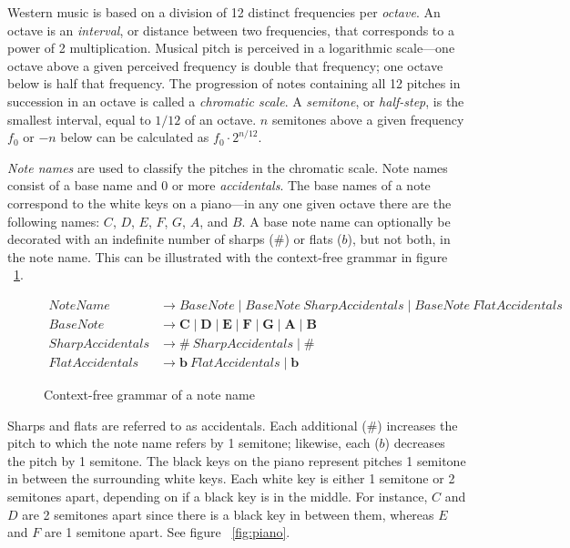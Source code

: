 Western music is based on a division of 12 distinct frequencies per \textit{octave}. An octave is an \textit{interval}, or distance between two frequencies, that corresponds to a power of 2 multiplication. Musical pitch is perceived in a logarithmic scale---one octave above a given perceived frequency is double that frequency; one octave below is half that frequency. The progression of notes containing all 12 pitches in succession in an octave is called a \textit{chromatic scale}. A \textit{semitone}, or \textit{half-step}, is the smallest interval, equal to $1/12$ of an octave. $n$ semitones above a given frequency $f_0$ or $-n$ below can be calculated as $f_0 \cdot 2^{n/12}$.

\textit{Note names} are used to classify the pitches in the chromatic scale. Note names consist of a base name and 0 or more \textit{accidentals}. The base names of a note correspond to the white keys on a piano---in any one given octave there are the following names: $C$, $D$, $E$, $F$, $G$, $A$, and $B$. A base note name can optionally be decorated with an indefinite number of sharps ($\#$) or flats ($b$), but not both, in the note name. This can be illustrated with the context-free grammar in figure ~\ref{fig:cfgnote}.

\begin{figure}[h!]
\begin{center}
\begin{align*}
NoteName &\to BaseNote \mid BaseNote\ SharpAccidentals \mid BaseNote\ FlatAccidentals \\
BaseNote &\to \mathbf{C} \mid \mathbf{D} \mid \mathbf{E} \mid \mathbf{F} \mid \mathbf{G} \mid \mathbf{A} \mid \mathbf{B} \\
SharpAccidentals &\to \bm{\#}\ SharpAccidentals \mid \bm{\#} \\
FlatAccidentals &\to \bm{b}\ FlatAccidentals \mid \bm{b}
\end{align*}
\caption{Context-free grammar of a note name}
\label{fig:cfgnote}
\end{center}
\end{figure}


Sharps and flats are referred to as accidentals. Each additional ($\#$) increases the pitch to which the note name refers by 1 semitone; likewise, each ($b$) decreases the pitch by 1 semitone.  The black keys on the piano represent pitches 1 semitone in between the surrounding white keys. Each white key is either 1 semitone or 2 semitones apart, depending on if a black key is in the middle. For instance, $C$ and $D$ are 2 semitones apart since there is a black key in between them, whereas $E$ and $F$ are 1 semitone apart. See figure ~\ref{fig:piano}.
